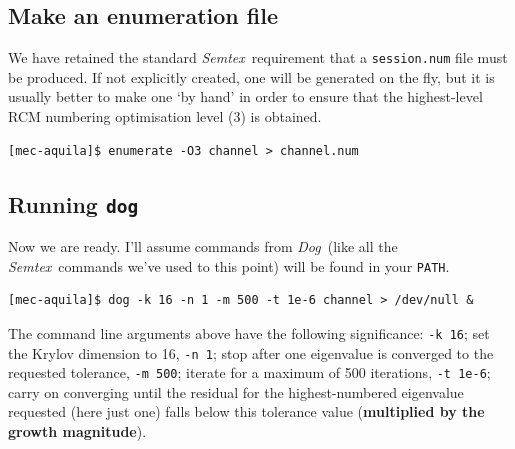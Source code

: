 \documentclass[11pt,a4paper]{report}
\newcommand{\Semtex}{\emph{Semtex}}
\newcommand{\Dog}{\emph{Dog}}
\begin{document}
\subsection{Make an enumeration file}

We have retained the standard \Semtex\ requirement that a
\verb+session.num+ file must be produced. If not explicitly created,
one will be generated on the fly, but it is usually better to make one
`by hand' in order to ensure that the highest-level RCM numbering
optimisation level (3) is obtained.  {\small
\begin{verbatim}
[mec-aquila]$ enumerate -O3 channel > channel.num
\end{verbatim}
}

\subsection{Running \texttt{dog}}

Now we are ready. I'll assume commands from \Dog\ (like all the
\Semtex\ commands we've used to this point) will be found in your
\texttt{PATH}.
{\small
\begin{verbatim}
[mec-aquila]$ dog -k 16 -n 1 -m 500 -t 1e-6 channel > /dev/null &
\end{verbatim}
}The command line arguments above have the following significance:
\verb+-k 16+; set the Krylov dimension to 16, \verb+-n 1+; stop after
one eigenvalue is converged to the requested tolerance,
\verb+-m 500+; iterate for a maximum of 500 iterations, \verb+-t 1e-6+;
carry on converging until the residual for the highest-numbered
eigenvalue requested (here just one) falls below this tolerance value
(\textbf{multiplied by the growth magnitude}).
\end{document}

